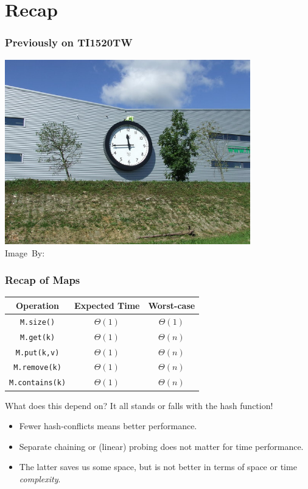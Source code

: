 \section{Recap}%
\label{sec:recap}

\begin{frame}
	\frametitle{Previously on TI1520TW}
	\begin{center}
		\includegraphics[width=0.8\textwidth]{figures/clock.jpg}\\
		\hspace*{15pt}\hbox{\scriptsize Image By:}
	\end{center}
	
\end{frame}

\begin{frame}
	\frametitle{Recap of Maps}
	
	\begin{center}
		\begin{tabular}{c | c | c}
			Operation & Expected Time & Worst-case \\
			\midrule
			\texttt{M.size()} & $\Theta(1)$& $\Theta(1)$\\
			\texttt{M.get(k)}  & $\Theta(1)$& $\Theta(n)$\\
			\texttt{M.put(k,v)} & $\Theta(1)$& $\Theta(n)$\\
			\texttt{M.remove(k)} & $\Theta(1)$& $\Theta(n)$\\
			\texttt{M.contains(k)} & $\Theta(1)$& $\Theta(n)$\\
		\end{tabular}
	\end{center}
		\begin{block}{What does this depend on?}
			It all stands or falls with the hash function!
			\begin{itemize}
				\item Fewer hash-conflicts means better performance.
				\item Separate chaining or (linear) probing does not matter for time performance.
				\item The latter saves us some space, but is not better in terms of space or time \textit{complexity}.
			\end{itemize}
		\end{block}	
\end{frame}

